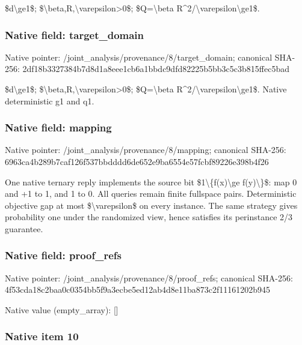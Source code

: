 \documentclass[10pt,a4paper]{article}
\begin{document}
\$d\textbackslash{}ge1\$; \$\textbackslash{}beta,R,\textbackslash{}varepsilon>0\$; \$Q=\textbackslash{}beta R\textasciicircum{}2/\textbackslash{}varepsilon\textbackslash{}ge1\$.


\subsubsection{Native field: target\_domain}


Native pointer: /joint\_analysis/provenan\allowbreak{}ce/8/target\_domain; canonical SHA-256: 2df18b3327384b7d8d1a8eee\allowbreak{}1cb6a1bbdc9dfd82225b5bb3\allowbreak{}c5c3b815ffec5bad


\$d\textbackslash{}ge1\$; \$\textbackslash{}beta,R,\textbackslash{}varepsilon>0\$; \$Q=\textbackslash{}beta R\textasciicircum{}2/\textbackslash{}varepsilon\textbackslash{}ge1\$. Native deterministic g1 and q1.


\subsubsection{Native field: mapping}


Native pointer: /joint\_analysis/provenance/8/mapping; canonical SHA-256: 6963ca4b289b7caf126f537b\allowbreak{}bdddd6de652e9ba6554e57fc\allowbreak{}bf89226e398b4f26


One native ternary reply implements the source bit \$1\textbackslash{}\{f(x)\textbackslash{}ge f(y)\textbackslash{}\}\$: map 0 and +1 to 1, and 1 to 0. All queries remain finite fullspace pairs. Deterministic objective gap at most \$\textbackslash{}varepsilon\$ on every instance. The same strategy gives probability one under the randomized view, hence satisfies its perinstance 2/3 guarantee.


\subsubsection{Native field: proof\_refs}


Native pointer: /joint\_analysis/provenance/8/proof\_refs; canonical SHA-256: 4f53cda18c2baa0c0354bb5f\allowbreak{}9a3ecbe5ed12ab4d8e11ba87\allowbreak{}3c2f11161202b945



Native value (empty\_array): []



\subsubsection{Native item 10}
\end{document}
